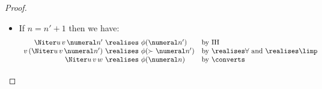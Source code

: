 \begin{proof}
\begin{itemize}
\begin{itemize}
            \item If $n = n'+1$ then we have:
            \[
            \begin{array}[b]{r@{\ \realises\ }ll}
                 \Niter u\, v\, \numeral n' & \phi(\numeral n') & \text{by IH} \\
                 v\, (\Niter u\, v\, \numeral n') & \phi(\succ{\numeral n'}) & \text{by $\realises\forall$ and $\realises\limp$} \\
                 \Niter u\, v\, w & \phi(\numeral n) & \text{by $\converts$} \tag*{\qed}
            \end{array}
            \]
        \end{itemize}
    \end{itemize}
    \renewcommand{\qed}{}
\end{proof}

